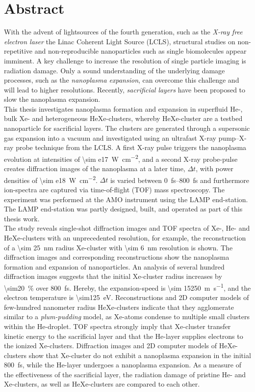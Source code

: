 \section*{Abstract}\label{ch:abstract}
With the advent of lightsources of the fourth generation, such as the \textit{X-ray free electron laser} the Linac Coherent Light Source (LCLS), structural studies on non-repetitive and non-reproducible nanoparticles such as single biomolecules appear imminent. A key challenge to increase the resolution of single particle imaging is radiation damage. Only a sound understanding of the underlying damage processes, such as the \textit{nanoplasma expansion}, can overcome this challenge and will lead to higher resolutions. Recently, \textit{sacrificial layers} have been proposed to slow the nanoplasma expansion.\\[0.4\baselineskip]
%
This thesis investigates nanoplasma formation and expansion in superfluid He-, bulk Xe- and heterogeneous HeXe-clusters, whereby HeXe-cluster are a testbed nanoparticle for sacrificial layers. The clusters are generated through a supersonic gas expansion into a vacuum and investigated using an ultrafast X-ray pump--X-ray probe technique from the LCLS. A first X-ray pulse triggers the nanoplasma evolution at intensities of \SI{\sim e17}{\watt\per\square\centi\meter}, and a second X-ray probe-pulse creates diffraction images of the nanoplasma at a later time, $\Delta t$, with power densities of \SI{\sim e18}{\watt\per\square\centi\meter}. $\Delta t$ is varied between \SIrange{0}{800}{\femto\second} and furthermore ion-spectra are captured via time-of-flight (TOF) mass spectroscopy. The experiment was performed at the AMO instrument using the LAMP end-station. The LAMP end-station was partly designed, built, and operated as part of this thesis work.\\[0.4\baselineskip]
%
The study reveals single-shot diffraction images and TOF spectra of Xe-, He- and HeXe-clusters with an unprecedented resolution, for example, the reconstruction of a \SI{\sim 25}{\nano\meter} radius Xe-cluster with \SI{\sim 6}{\nano\meter} resolution is shown. The diffraction images and corresponding reconstructions show the nanoplasma formation and expansion of nanoparticles. An analysis of several hundred diffraction images suggests that the initial Xe-cluster radius increases by \SI{\sim20}{\percent} over \SI{800}{\femto\second}. Hereby, the expansion-speed is \SI{\sim 15250}{\meter\per\second}, and the electron temperature is \SI{\sim125}{\electronvolt}. Reconstructions and 2D computer models of few-hundred nanometer radius HeXe-clusters indicate that they agglomerate similar to a \textit{plum-pudding} model, as Xe-atoms condense to multiple small clusters within the He-droplet. TOF spectra strongly imply that Xe-cluster transfer kinetic energy to the sacrificial layer and that the He-layer supplies electrons to the ionized Xe-clusters. Diffraction images and 2D computer models of HeXe-clusters show that Xe-cluster do not exhibit a nanoplasma expansion in the initial \SI{800}{\femto\second}, while the He-layer undergoes a nanoplasma expansion. As a measure of the effectiveness of the sacrificial layer, the radiation damage of pristine He- and Xe-clusters, as well as HeXe-clusters are compared to each other.
%
%
%
%